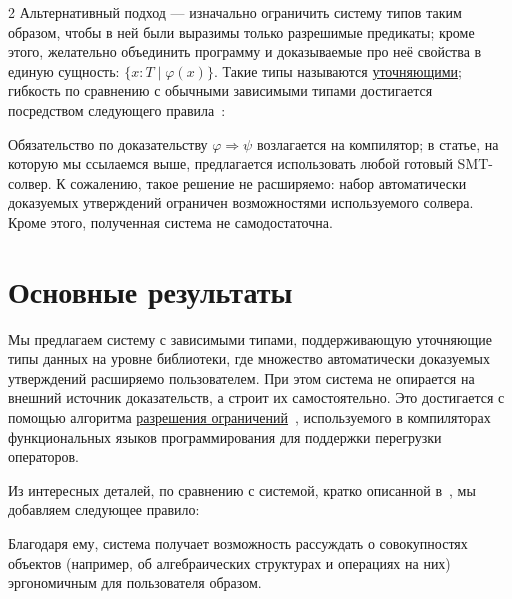 \documentclass[final]{beamer}
\begin{document}
\begin{frame}[t]
\begin{multicols}{2}
Альтернативный подход --- изначально ограничить систему
типов таким образом, чтобы в ней были выразимы только
разрешимые предикаты; кроме этого, желательно объединить
программу и доказываемые про неё свойства в единую
сущность: $\{ x : T \;|\; \varphi(x) \}$. Такие типы
называются \underline{уточняющими}; гибкость по
сравнению с обычными зависимыми типами достигается
посредством следующего
правила~\cite{shen2021smtbasedrefinementtypesagda}:
\begin{mathpar}
\end{mathpar}
Обязательство по доказательству $\varphi\Rightarrow\psi$
возлагается на компилятор; в статье, на которую мы
ссылаемся выше, предлагается использовать любой готовый
SMT-солвер. К сожалению, такое решение не расширяемо:
набор автоматически доказуемых утверждений ограничен
возможностями используемого солвера. Кроме этого,
полученная система не самодостаточна.

\section{Основные результаты}

Мы предлагаем систему с зависимыми типами,
поддерживающую уточняющие типы данных на уровне
библиотеки, где множество автоматически доказуемых
утверждений расширяемо пользователем. При этом система
не опирается на внешний источник доказательств, а строит
их самостоятельно. Это достигается с помощью алгоритма
\underline{разрешения ограничений}~\cite{selsam2020tabledtypeclassresolution},
используемого в компиляторах функциональных языков
программирования для поддержки перегрузки операторов.

Из интересных деталей, по сравнению с системой, кратко
описанной в~\cite{shen2021smtbasedrefinementtypesagda},
мы добавляем следующее правило:
\begin{mathpar}
\end{mathpar}
Благодаря ему, система получает возможность рассуждать
о совокупностях объектов (например, об алгебраических
структурах и операциях на них) эргономичным для
пользователя образом.


\end{multicols}
\end{frame}
\end{document}
